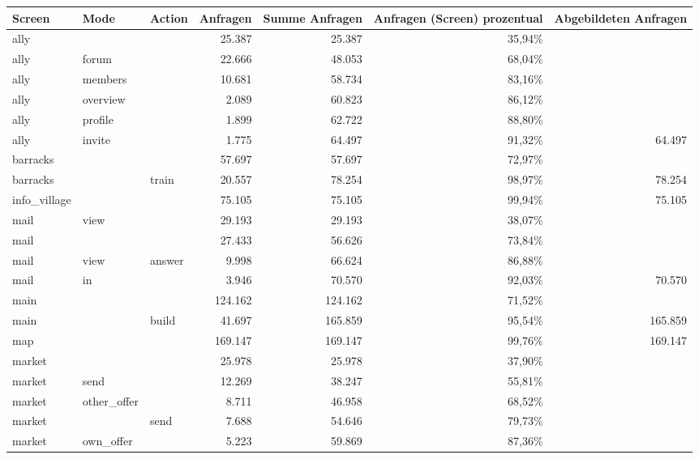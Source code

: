 \documentclass[10pt]{scrartcl}
\begin{document}
\begin{landscape}
\begin{table}[htbp]
\begin{tabular}{|l|l|l|r|r|r|l|}
\hline
\textbf{Screen} & \textbf{Mode} & \textbf{Action} & \multicolumn{1}{l|}{\textbf{Anfragen}} & \multicolumn{1}{l|}{\textbf{Summe Anfragen}} & \multicolumn{1}{l|}{\textbf{Anfragen (Screen) prozentual}} & \textbf{Abgebildeten Anfragen} \\ \hline
ally &  &  & 25.387 & 25.387 & 35,94\% &  \\ \hline
ally & forum &  & 22.666 & 48.053 & 68,04\% &  \\ \hline
ally & members &  & 10.681 & 58.734 & 83,16\% &  \\ \hline
ally & overview &  & 2.089 & 60.823 & 86,12\% &  \\ \hline
ally & profile &  & 1.899 & 62.722 & 88,80\% &  \\ \hline
ally & invite &  & 1.775 & 64.497 & 91,32\% & \multicolumn{1}{r|}{64.497} \\ \hline
barracks &  &  & 57.697 & 57.697 & 72,97\% &  \\ \hline
barracks &  & train & 20.557 & 78.254 & 98,97\% & \multicolumn{1}{r|}{78.254} \\ \hline
info\_village &  &  & 75.105 & 75.105 & 99,94\% & \multicolumn{1}{r|}{75.105} \\ \hline
mail & view &  & 29.193 & 29.193 & 38,07\% &  \\ \hline
mail &  &  & 27.433 & 56.626 & 73,84\% &  \\ \hline
mail & view & answer & 9.998 & 66.624 & 86,88\% &  \\ \hline
mail & in &  & 3.946 & 70.570 & 92,03\% & \multicolumn{1}{r|}{70.570} \\ \hline
main &  &  & 124.162 & 124.162 & 71,52\% &  \\ \hline
main &  & build & 41.697 & 165.859 & 95,54\% & \multicolumn{1}{r|}{165.859} \\ \hline
map &  &  & 169.147 & 169.147 & 99,76\% & \multicolumn{1}{r|}{169.147} \\ \hline
market &  &  & 25.978 & 25.978 & 37,90\% &  \\ \hline
market & send &  & 12.269 & 38.247 & 55,81\% &  \\ \hline
market & other\_offer &  & 8.711 & 46.958 & 68,52\% &  \\ \hline
market &  & send & 7.688 & 54.646 & 79,73\% &  \\ \hline
market & own\_offer &  & 5.223 & 59.869 & 87,36\% &  \\ \hline

\end{tabular}
\end{table}
\end{landscape}
\end{document}
